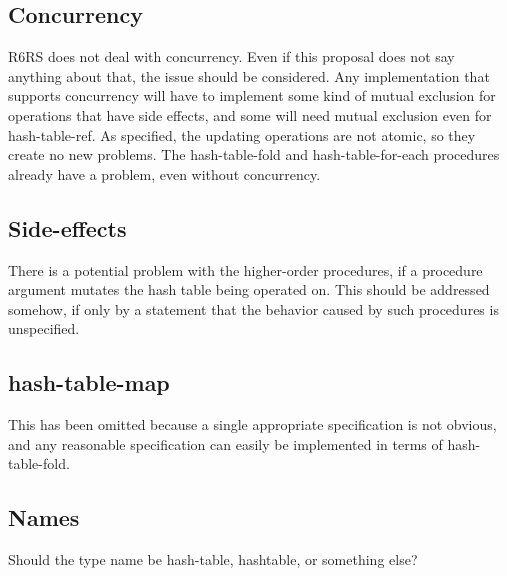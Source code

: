 \documentclass[twoside]{algol60}
\begin{document}
\subsection{Concurrency}
R6RS does not deal with concurrency.  Even if this proposal does not say anything about that, the issue should be considered.  Any implementation that supports concurrency will have to implement some kind of mutual exclusion for operations that have side effects, and some will need mutual exclusion even for {\cf hash-table-ref}.  As specified, the updating operations are not atomic, so they create no new problems.  The {\cf hash-table-fold} and {\cf hash-table-for-each} procedures already have a problem, even without concurrency.

\subsection{Side-effects}
There is a potential problem with the higher-order procedures, if a procedure argument mutates the hash table being operated on.  This should be addressed somehow, if only by a statement that the behavior caused by such procedures is unspecified.

\subsection{hash-table-map}
This has been omitted because a single appropriate specification is not obvious, and any reasonable specification can easily be implemented in terms of {\cf hash-table-fold}.

\subsection{Names}
Should the type name be {\cf hash-table}, {\cf hashtable}, or something else?


\end{document}

